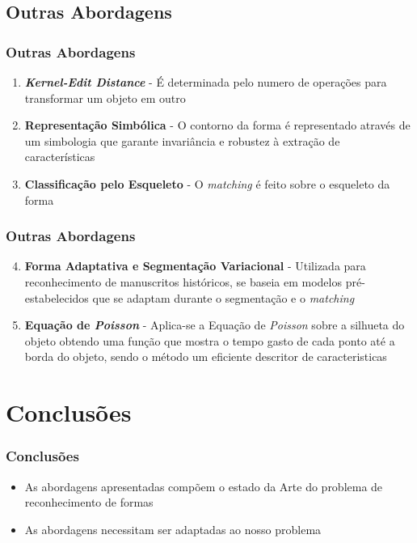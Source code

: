 \documentclass[brazil,a4paper,12pt]{beamer}%
\begin{document}
   \subsection{Outras Abordagens}
     \begin{frame}
      \frametitle{Outras Abordagens}
	\begin{enumerate}
	 \item{\textbf{\textit{Kernel-Edit Distance}} - É determinada pelo numero de operações para transformar um objeto em 
	    outro} 
	 \item{\textbf{Representação Simbólica} - O contorno da forma é representado através de um simbologia que garante 
	    invariância e robustez à extração de características}
	 \item{\textbf{Classificação pelo Esqueleto} - O \textit{matching} é feito sobre o esqueleto da forma}
	\end{enumerate}
     \end{frame}
     \begin{frame}
      \frametitle{Outras Abordagens}
	\begin{enumerate}
	 \setcounter{enumi}{3}
	 \item{\textbf{Forma Adaptativa e Segmentação Variacional} - Utilizada para reconhecimento de manuscritos históricos, 
	    se baseia em modelos pré-estabelecidos que se adaptam durante o segmentação e o \textit{matching}}
	 \item{\textbf{Equação de \textit{Poisson}} - Aplica-se a Equação de \textit{Poisson} sobre a silhueta do objeto
	    obtendo uma função que mostra o tempo gasto de cada ponto até a borda do objeto, sendo o método um eficiente descritor
	    de caracteristicas}
	\end{enumerate}

     \end{frame}


  \section{Conclusões}
    
   \begin{frame}
     \frametitle{Conclusões}
      \begin{itemize}
       \item{As abordagens apresentadas compõem o estado da Arte do problema de reconhecimento de formas}
       \item{As abordagens necessitam ser adaptadas ao nosso problema}
      \end{itemize}
   \end{frame}
\end{document}
